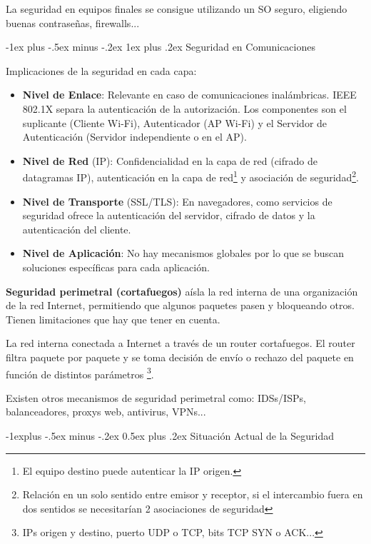 \documentclass[10pt,portrait, twocolumn]{article}
\makeatletter
\renewcommand{\subsection}{\@startsection{subsection}{2}{0mm}%
                                {-1explus -.5ex minus -.2ex}%
                                {0.5ex plus .2ex}%
                                {\normalfont\normalsize\bfseries}}
\renewcommand{\subsubsection}{\@startsection{subsubsection}{3}{0mm}%
                                {-1ex plus -.5ex minus -.2ex}%
                                {1ex plus .2ex}%
                                {\normalfont\small\bfseries}}
\makeatother
\begin{document}
La seguridad en equipos finales se consigue utilizando un SO seguro, eligiendo buenas contraseñas, firewalls...

\subsubsection{Seguridad en Comunicaciones}

Implicaciones de la seguridad en cada capa:

	\begin{itemize}
		\item \textbf{Nivel de Enlace}: Relevante en caso de comunicaciones inalámbricas. IEEE 802.1X separa la autenticación de la autorización. Los componentes son el suplicante (Cliente Wi-Fi), Autenticador (AP Wi-Fi) y el Servidor de Autenticación (Servidor independiente o en el AP).
		\item \textbf{Nivel de Red} (IP): Confidencialidad en la capa de red (cifrado de datagramas IP), autenticación en la capa de red\footnote{El equipo destino puede autenticar la IP origen.} y asociación de seguridad\footnote{Relación en un solo sentido entre emisor y receptor, si el intercambio fuera en dos sentidos se necesitarían 2 asociaciones de seguridad}.
		\item \textbf{Nivel de Transporte} (SSL/TLS): En navegadores, como servicios de seguridad ofrece la autenticación del servidor, cifrado de datos y la autenticación del cliente.
		\item \textbf{Nivel de Aplicación}: No hay mecanismos globales por lo que se buscan soluciones específicas para cada aplicación.
	\end{itemize}
	
\textbf{Seguridad perimetral (cortafuegos)} aísla la red interna de una organización de la red Internet, permitiendo que algunos paquetes pasen y bloqueando otros. Tienen limitaciones que hay que tener en cuenta.

\quad La red interna conectada a Internet a través de un router cortafuegos. El router filtra paquete por paquete y se toma decisión de envío o rechazo del paquete en función de distintos parámetros \footnote{IPs origen y destino, puerto UDP o TCP, bits TCP SYN o ACK...}.

\quad Existen otros mecanismos de seguridad perimetral como: IDSs/ISPs, balanceadores, proxys web, antivirus, VPNs...


\subsection{Situación Actual de la Seguridad}
\end{document}
